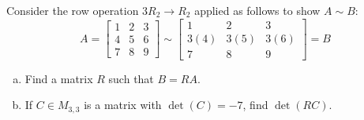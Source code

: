 \begin{activity}{5}
Consider the row operation \(3R_2\to R_2\) applied as follows to show
\(A\sim B\):
\[
A=\begin{bmatrix}1&2&3\\4&5&6\\7&8&9\end{bmatrix}
  \sim
\begin{bmatrix}1&2&3\\3(4)&3(5)&3(6)\\7&8&9\end{bmatrix}=B
\]
\begin{enumerate}[(a)]
\item Find a matrix \(R\) such that \(B=RA\).
\item If \(C \in M_{3,3}\) is a matrix with \(\det(C)= -7\), find \(\det(RC)\).
\end{enumerate}
\end{activity}


